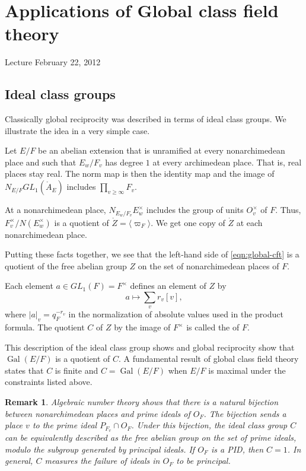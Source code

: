 \documentclass{amsart}
\newtheorem{remark}[equation]{Remark}
\def\op#1{{\operatorname{#1}}}
\def\AA{\ring{A}}
\def\oG{\op{Gal}}
\begin{document}
\section{Applications of Global class field theory}

Lecture February 22, 2012

\subsection{Ideal class groups}

Classically global reciprocity was described in terms of ideal class groups.  We illustrate
the idea in a very simple case.

Let $E/F$ be an abelian extension that is unramified at every nonarchimedean place
and such that $E_w/F_v$ has degree $1$ at every archimedean place.  That is,
real places stay real.  The norm map is then the identity map and the image of
$N_{E/F} GL_1(\AA_E)$ includes $\prod_{v\ge\infty} F_v$.

At a nonarchimedean place, $N_{E_w/F_v} E^\times_w$ includes the group
of units $O_v^\times$ of $F$.  Thus, $F_v^\times/N (E_w^\times)$ is a
quotient of $\ring{Z} = \langle \varpi_F\rangle$.  We get one copy of
$\ring{Z}$ at each nonarchimedean place.

Putting these facts together, we see that the left-hand side of
\eqref{eqn:global-cft} is a quotient of the free abelian group $Z$ on
the set of nonarchimedean places of $F$.

Each element $a\in GL_1(F)=F^\times$ defines an element of $Z$ by
\[
a \mapsto \sum_v r_v [v],
\]
where $|a|_v = q_F^{-r_v}$ in the normalization of absolute values
used in the product formula.  The quotient $C$ of $Z$ by the image of
$F^\times$ is called the  of $F$.

This description of the ideal class group shows and global reciprocity show
that $\oG(E/F)$ is a quotient of $C$.  A fundamental result of global class
field theory states that $C$ is finite and $C = \oG(E/F)$ when $E/F$ is
maximal under the constraints listed above.

\begin{remark} Algebraic number theory shows that there is a natural
bijection between  nonarchimedean places and prime ideals of $O_F$.
The bijection sends a place $v$ to the prime ideal $P_{F_v}\cap O_F$.
Under this bijection, the ideal class group $C$ can be equivalently described as
the free abelian group on the set of prime ideals, modulo the subgroup generated
by principal  ideals.  If $O_F$ is a PID, then $C=1$.  In general, $C$
measures the failure of ideals in $O_F$ to be principal.
\end{remark}
\end{document}
